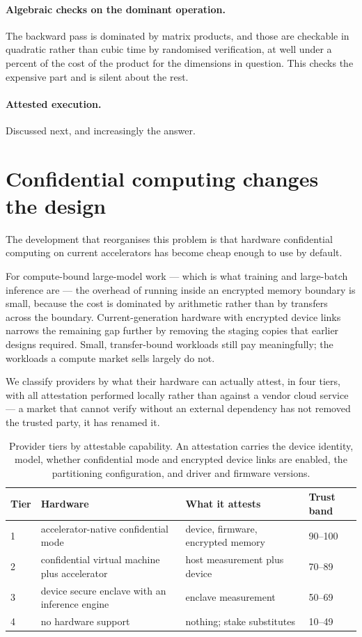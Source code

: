 \documentclass[11pt,a4paper]{article}
\begin{document}
\paragraph{Algebraic checks on the dominant operation.} The backward pass is
dominated by matrix products, and those are checkable in quadratic rather than
cubic time by randomised verification, at well under a percent of the cost of the
product for the dimensions in question. This checks the expensive part and is
silent about the rest.

\paragraph{Attested execution.} Discussed next, and increasingly the answer.

\section{Confidential computing changes the design}

The development that reorganises this problem is that hardware confidential
computing on current accelerators has become cheap enough to use by default.

For compute-bound large-model work --- which is what training and large-batch
inference are --- the overhead of running inside an encrypted memory boundary is
small, because the cost is dominated by arithmetic rather than by transfers
across the boundary. Current-generation hardware with encrypted device links
narrows the remaining gap further by removing the staging copies that earlier
designs required. Small, transfer-bound workloads still pay meaningfully; the
workloads a compute market sells largely do not.

We classify providers by what their hardware can actually attest, in four tiers,
with all attestation performed locally rather than against a vendor cloud service
--- a market that cannot verify without an external dependency has not removed the
trusted party, it has renamed it.

\begin{table}[h]
\centering
\begin{tabular}{llll}
\toprule
Tier & Hardware & What it attests & Trust band \\
\midrule
1 & accelerator-native confidential mode & device, firmware, encrypted memory & 90--100 \\
2 & confidential virtual machine plus accelerator & host measurement plus device & 70--89 \\
3 & device secure enclave with an inference engine & enclave measurement & 50--69 \\
4 & no hardware support & nothing; stake substitutes & 10--49 \\
\bottomrule
\end{tabular}
\caption{Provider tiers by attestable capability. An attestation carries the
device identity, model, whether confidential mode and encrypted device links are
enabled, the partitioning configuration, and driver and firmware versions.}
\end{table}
\end{document}
